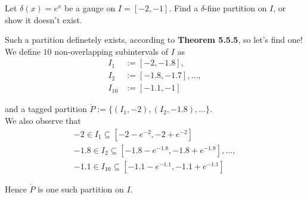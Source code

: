 \documentclass[boxes, qed]{homework}
\begin{document}
\begin{problem}Let $\delta(x)=e^x$ be a gauge on $I=[-2,-1]$. Find a $\delta$-fine
  partition on $I$, or show it doesn't exist.
\end{problem}
\begin{solution}Such a partition definetely exists, according to \textbf{Theorem 5.5.5}, so
  let's find one!\\
  
  We define $10$ non-overlapping subintervals of $I$ as
  \begin{align*}
    I_1&:=[-2,-1.8],\\
    I_2&:=[-1.8,-1.7],\dots,\\
    I_{10}&:=[-1.1,-1]
  \end{align*}

  and a tagged partition $\dot{P}:=\{(I_1,-2),(I_2,-1.8),\dots\}$.\\

  We also observe that
  \begin{align*}
    -2 \in I_1 \subseteq [-2-e^{-2},-2+e^{-2}]\\
    -1.8 \in I_2 \subseteq [-1.8-e^{-1.8},-1.8+e^{-1.8}],\dots,\\
    -1.1 \in I_{10} \subseteq [-1.1-e^{-1.1},-1.1+e^{-1.1}]
  \end{align*}

  Hence $\dot{P}$ is one such partition on $I$.
\end{solution}
\end{document}
